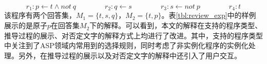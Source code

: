 $$r_1: p \leftarrow t \land not\ q \qquad\qquad r_2: q \leftarrow s \qquad\qquad r_3: s \leftarrow not\ p \qquad\qquad r_4: t$$%
该程序有两个回答集，$M_1=\{t,s,q\}$，$M_2=\{t, p\}$。表\ref{tbl:review_exp}中的样例展示的是原子$p$在回答集$M_2$下的解释。可以看到，本文的解释在支持的程序类型、推导过程的展示、对否定文字的解释方式上均进行了改进。其中，支持的程序类型中关注到了ASP领域内常用到的选择规则，同时考虑了非实例化程序的实例化处理。另外，在推导过程的展示以及对否定文字的解释中还引入了用户交互。
\begin{table}
    \caption{已有一致性程序解释工作总结与本文对比}\label{tbl:review_exp}
    \begin{adjustbox}{scale=0.55,center}
    \centering
    \semiLarge
\end{adjustbox}
\end{table}
